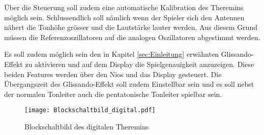 Über die Steuerung soll zudem eine automatische Kalibration des Theremins möglich sein. Schlussendlich soll nämlich wenn der Spieler sich den Antennen nähert die Tonhöhe grösser und die Lautstärke lauter werden. Aus diesem Grund müssen die Referenzoszillatoren auf die analogen Oszillatoren abgestimmt werden.

Es soll zudem möglich sein den in Kapitel \ref{sec:Einleitung} erwähnten Glissando-Effekt zu aktivieren und auf dem Display die Spielgenauigkeit anzuzeigen. Diese beiden Features werden über den Nios und das Display gesteuert. Die Übergangszeit des Glissando-Effekt soll zudem Einstellbar sein und es soll nebst der normalen Tonleiter auch die pentatonische Tonleiter spielbar sein.

\begin{figure}[h]
	\centering
	\texttt{[image: Blockschaltbild\_digital.pdf]}
	\caption{Blockschaltbild des digitalen Theremins}
	\label{img:Blockschaltbild_digital}
\end{figure}